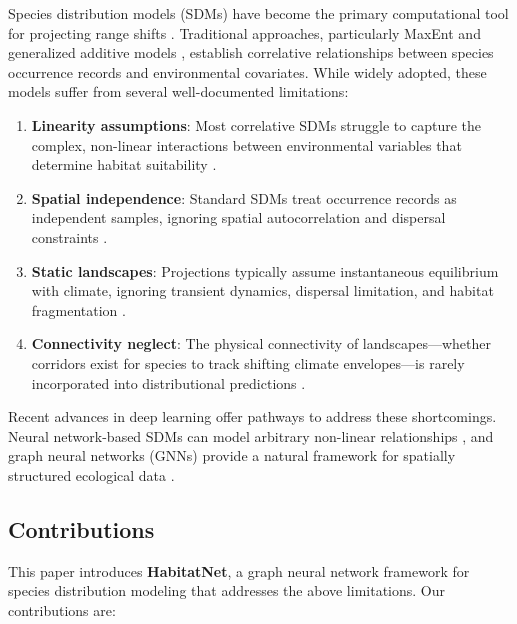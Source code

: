 \documentclass[11pt,a4paper]{article}
\begin{document}
Species distribution models (SDMs) have become the primary computational
tool for projecting range shifts \citep{elith2009species,
guisan2005predicting}. Traditional approaches, particularly MaxEnt
\citep{phillips2006maximum} and generalized additive models
\citep{hastie1990generalized}, establish correlative relationships between
species occurrence records and environmental covariates. While widely
adopted, these models suffer from several well-documented limitations:

\begin{enumerate}[label=(\roman*)]
  \item \textbf{Linearity assumptions}: Most correlative SDMs struggle to
    capture the complex, non-linear interactions between environmental
    variables that determine habitat suitability
    \citep{elith2006novel}.
  \item \textbf{Spatial independence}: Standard SDMs treat occurrence
    records as independent samples, ignoring spatial autocorrelation and
    dispersal constraints \citep{dormann2007methods}.
  \item \textbf{Static landscapes}: Projections typically assume
    instantaneous equilibrium with climate, ignoring transient dynamics,
    dispersal limitation, and habitat fragmentation
    \citep{zurell2016benchmarking}.
  \item \textbf{Connectivity neglect}: The physical connectivity of
    landscapes---whether corridors exist for species to track shifting
    climate envelopes---is rarely incorporated into distributional
    predictions \citep{hodgson2009climate}.
\end{enumerate}

Recent advances in deep learning offer pathways to address these
shortcomings. Neural network-based SDMs can model arbitrary non-linear
relationships \citep{botella2018deep, chen2020deep}, and graph neural
networks (GNNs) provide a natural framework for spatially structured
ecological data \citep{jetz2019essential}.

\subsection{Contributions}

This paper introduces \textbf{HabitatNet}, a graph neural network
framework for species distribution modeling that addresses the above
limitations. Our contributions are:
\end{document}

